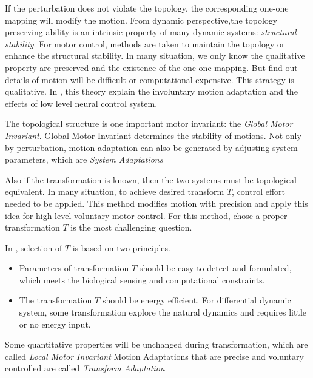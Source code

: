 If the perturbation does not violate the topology, the corresponding one-one mapping will modify the motion.
From dynamic perspective,the topology preserving ability is an intrinsic property of many dynamic systems:
\emph{structural stability}.
For motor control, methods are taken to maintain the topology or enhance the structural stability.
In many situation, we only know the qualitative property are preserved and the existence of the one-one mapping.
But find out details of motion will be difficult or computational expensive.
This strategy is qualitative.
In \moit, this theory explain the involuntary motion adaptation and the effects of low level neural control system.

The topological structure is one important motor invariant: the \emph{Global Motor Invariant}.
Global Motor Invariant determines the stability of motions.
Not only by perturbation, motion adaptation can also be generated by adjusting system parameters, which are \emph{System Adaptations}





Also if the transformation is known, then the two systems must be topological equivalent.
In many situation, to achieve desired transform $T$, control effort needed to be applied.
This method  modifies motion with precision and \moit apply this idea for high level voluntary motor control.
For this method, chose a proper transformation $T$ is the most challenging  question.

In \moit, selection of $T$ is based on two principles.
\begin{itemize}
\item
Parameters of transformation $T$ should be easy to detect and formulated, which meets the biological sensing and computational constraints. 

\item 
The transformation $T$ should be energy efficient.
For differential dynamic system, some transformation explore the natural dynamics and requires little or no energy input.
\end{itemize}

Some quantitative properties will be unchanged during transformation, which are called \emph{Local Motor Invariant}
Motion Adaptations that are precise and voluntary controlled are called \emph{Transform Adaptation}





%
%
%
%
%




